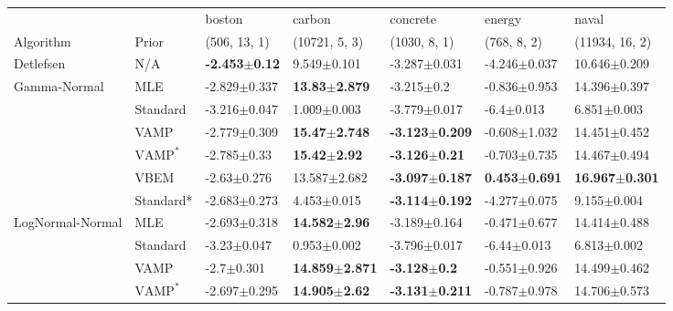 \begin{tabular}{lllllll}
\toprule
                 &      &                    boston &                     carbon &                   concrete &                    energy &                      naval \\
Algorithm & Prior& (506, 13, 1)& (10721, 5, 3)& (1030, 8, 1)& (768, 8, 2)& (11934, 16, 2)\\
\midrule
Detlefsen & N/A &  \textbf{-2.453$\pm$0.12} &            9.549$\pm$0.101 &           -3.287$\pm$0.031 &          -4.246$\pm$0.037 &           10.646$\pm$0.209 \\
Gamma-Normal & MLE &          -2.829$\pm$0.337 &   \textbf{13.83$\pm$2.879} &             -3.215$\pm$0.2 &          -0.836$\pm$0.953 &           14.396$\pm$0.397 \\
                 & Standard &          -3.216$\pm$0.047 &            1.009$\pm$0.003 &           -3.779$\pm$0.017 &            -6.4$\pm$0.013 &            6.851$\pm$0.003 \\
                 & VAMP &          -2.779$\pm$0.309 &   \textbf{15.47$\pm$2.748} &  \textbf{-3.123$\pm$0.209} &          -0.608$\pm$1.032 &           14.451$\pm$0.452 \\
                 & $\text{VAMP}^*$ &           -2.785$\pm$0.33 &    \textbf{15.42$\pm$2.92} &   \textbf{-3.126$\pm$0.21} &          -0.703$\pm$0.735 &           14.467$\pm$0.494 \\
                 & VBEM &           -2.63$\pm$0.276 &           13.587$\pm$2.682 &  \textbf{-3.097$\pm$0.187} &  \textbf{0.453$\pm$0.691} &  \textbf{16.967$\pm$0.301} \\
                 & Standard* &          -2.683$\pm$0.273 &            4.453$\pm$0.015 &  \textbf{-3.114$\pm$0.192} &          -4.277$\pm$0.075 &            9.155$\pm$0.004 \\
LogNormal-Normal & MLE &          -2.693$\pm$0.318 &   \textbf{14.582$\pm$2.96} &           -3.189$\pm$0.164 &          -0.471$\pm$0.677 &           14.414$\pm$0.488 \\
                 & Standard &           -3.23$\pm$0.047 &            0.953$\pm$0.002 &           -3.796$\pm$0.017 &           -6.44$\pm$0.013 &            6.813$\pm$0.002 \\
                 & VAMP &            -2.7$\pm$0.301 &  \textbf{14.859$\pm$2.871} &    \textbf{-3.128$\pm$0.2} &          -0.551$\pm$0.926 &           14.499$\pm$0.462 \\
                 & $\text{VAMP}^*$ &          -2.697$\pm$0.295 &   \textbf{14.905$\pm$2.62} &  \textbf{-3.131$\pm$0.211} &          -0.787$\pm$0.978 &           14.706$\pm$0.573 \\

\end{tabular}
